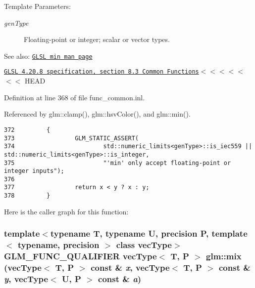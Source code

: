 \begin{Desc}
\item[Template Parameters:]
\begin{description}
\item[{\em genType}]Floating-point or integer; scalar or vector types.\end{description}
\end{Desc}
\begin{Desc}
\item[See also:]\href{http://www.opengl.org/sdk/docs/manglsl/xhtml/min.xml}{\tt GLSL min man page} 

\href{http://www.opengl.org/registry/doc/GLSLangSpec.4.20.8.pdf}{\tt GLSL 4.20.8 specification, section 8.3 Common Functions}$<$$<$$<$$<$$<$$<$$<$ HEAD \end{Desc}


Definition at line 368 of file func\_\-common.inl.

Referenced by glm::clamp(), glm::hsvColor(), and glm::min().

\begin{Code}\begin{verbatim}372         {
373                 GLM_STATIC_ASSERT(
374                         std::numeric_limits<genType>::is_iec559 || std::numeric_limits<genType>::is_integer,
375                         "'min' only accept floating-point or integer inputs");
376 
377                 return x < y ? x : y;
378         }
\end{verbatim}
\end{Code}




Here is the caller graph for this function:\hypertarget{group__core__func__common_gc208863c09fe827a44c976cc6d2aee33}{
\subsubsection[mix]{\setlength{\rightskip}{0pt plus 5cm}template$<$typename T, typename U, precision P, template$<$ typename, precision $>$ class vecType$>$ GLM\_\-FUNC\_\-QUALIFIER vecType$<$ T, P $>$ glm::mix (vecType$<$ T, P $>$ const \& {\em x}, \/  vecType$<$ T, P $>$ const \& {\em y}, \/  vecType$<$ U, P $>$ const \& {\em a})}}
\label{group__core__func__common_gc208863c09fe827a44c976cc6d2aee33}


